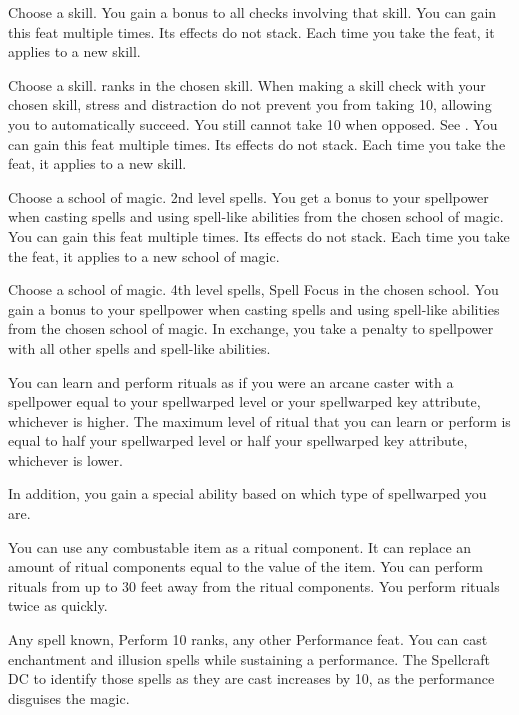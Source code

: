 Choose a skill.
\featben You gain a  bonus to all checks involving that skill.
You can gain this feat multiple times.
Its effects do not stack.
Each time you take the feat, it applies to a new skill.

Choose a skill.
 ranks in the chosen skill.
\featben When making a skill check with your chosen skill, stress and distraction do not prevent you from taking 10, allowing you to automatically succeed.
You still cannot take 10 when opposed.
See .
You can gain this feat multiple times.
Its effects do not stack.
Each time you take the feat, it applies to a new skill.

Choose a school of magic.
\featpre 2nd level spells.
\featben You get a  bonus to your spellpower when casting spells and using spell-like abilities from the chosen school of magic.
You can gain this feat multiple times.
Its effects do not stack.
Each time you take the feat, it applies to a new school of magic.

Choose a school of magic.
\featpres 4th level spells, Spell Focus in the chosen school.
\featben You gain a  bonus to your spellpower when casting spells and using spell-like abilities from the chosen school of magic.
In exchange, you take a  penalty to spellpower with all other spells and spell-like abilities.

\featben You can learn and perform rituals as if you were an arcane caster with a spellpower equal to your spellwarped level or your spellwarped key attribute, whichever is higher.
The maximum level of ritual that you can learn or perform is equal to half your spellwarped level or half your spellwarped key attribute, whichever is lower.

In addition, you gain a special ability based on which type of spellwarped you are.

 \x
{}
You can use any combustable item as a ritual component.
It can replace an amount of ritual components equal to the value of the item.
You can perform rituals from up to 30 feet away from the ritual components.
You perform rituals twice as quickly.

\featpres Any spell known, Perform 10 ranks, any other Performance feat.
\featben You can cast enchantment and illusion spells while sustaining a performance.
The Spellcraft DC to identify those spells as they are cast increases by 10, as the performance disguises the magic.

